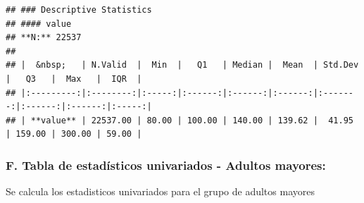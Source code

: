 \documentclass[
]{article}
\newenvironment{Shaded}{\begin{snugshade}}{\end{snugshade}}
\newcommand{\AttributeTok}[1]{\textcolor[rgb]{0.13,0.29,0.53}{#1}}
\newcommand{\ConstantTok}[1]{\textcolor[rgb]{0.56,0.35,0.01}{#1}}
\newcommand{\FunctionTok}[1]{\textcolor[rgb]{0.13,0.29,0.53}{\textbf{#1}}}
\newcommand{\NormalTok}[1]{#1}
\newcommand{\SpecialCharTok}[1]{\textcolor[rgb]{0.81,0.36,0.00}{\textbf{#1}}}
\newcommand{\StringTok}[1]{\textcolor[rgb]{0.31,0.60,0.02}{#1}}
\begin{document}
\begin{Shaded}
\end{Shaded}

\begin{verbatim}
## ### Descriptive Statistics  
## #### value  
## **N:** 22537  
## 
## |  &nbsp;   | N.Valid  |  Min  |   Q1   | Median |  Mean  | Std.Dev |   Q3   |  Max   |  IQR  |
## |:---------:|:--------:|:-----:|:------:|:------:|:------:|:-------:|:------:|:------:|:-----:|
## | **value** | 22537.00 | 80.00 | 100.00 | 140.00 | 139.62 |  41.95  | 159.00 | 300.00 | 59.00 |
\end{verbatim}

\hypertarget{f.-tabla-de-estaduxedsticos-univariados---adultos-mayores}{%
\subsubsection{\texorpdfstring{\textbf{F. Tabla de estadísticos
univariados - Adultos
mayores:}}{F. Tabla de estadísticos univariados - Adultos mayores:}}\label{f.-tabla-de-estaduxedsticos-univariados---adultos-mayores}}

Se calcula los estadisticos univariados para el grupo de adultos mayores

\begin{Shaded}
\end{Shaded}
\end{document}
